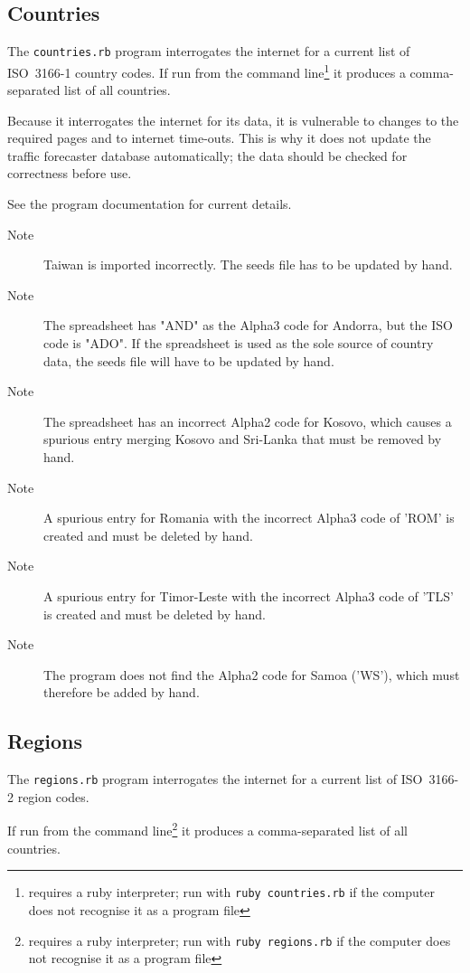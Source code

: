 \documentclass[]{report}
\begin{document}
\subsection{Countries}
The \verb!countries.rb! program interrogates the internet for a current list of ISO\ 3166-1 country codes. If run from the command line\footnote{requires a ruby interpreter; run with  \texttt{ruby countries.rb} if the computer does not recognise it as a program file} it produces a comma-separated list of all countries. 

Because it interrogates the internet for its data, it is vulnerable to changes to the required pages and to internet time-outs. This is why it does not update the traffic forecaster database automatically; the data should be checked for correctness before use.

See the program documentation for current details.

\begin{description}
\item[Note]Taiwan is imported incorrectly. The seeds file has to be updated by hand.
\item[Note]The spreadsheet has "AND" as the Alpha3 code for Andorra, but the ISO code is "ADO". If the spreadsheet is used as the sole source of country data, the seeds file will have to be updated by hand.
\item[Note]The spreadsheet has an incorrect Alpha2 code for Kosovo, which causes a spurious entry merging Kosovo and Sri-Lanka that must be removed by hand.
\item[Note]A spurious entry for Romania with the incorrect Alpha3 code of 'ROM' is created and must be deleted by hand.
\item[Note]A spurious entry for Timor-Leste with the incorrect Alpha3 code of 'TLS' is created and must be deleted by hand.
\item[Note]The program does not find the Alpha2 code for Samoa ('WS'), which must therefore be added by hand.
\end{description}

\subsection{Regions}
The \texttt{regions.rb} program interrogates the internet for a current list of ISO\ 3166-2 region codes.

 If run from the command line\footnote{requires a ruby interpreter; run with  \texttt{ruby regions.rb} if the computer does not recognise it as a program file} it produces a comma-separated list of all countries. 
\end{document}
